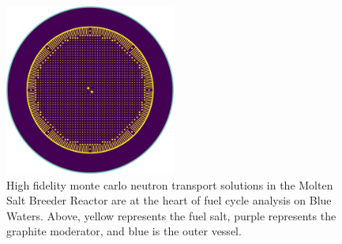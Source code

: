 \documentclass[letterpaper]{article}
\begin{document}
\begin{figure}[ht]
        \begin{center}
                \includegraphics[width=0.5\textwidth]{plan_view_ser.png}
        \end{center}
        \caption{High fidelity monte carlo neutron transport solutions in the
                Molten Salt Breeder Reactor are at the heart of fuel cycle
        analysis on Blue Waters. Above, yellow represents the fuel salt, purple 
represents the graphite moderator, and blue is the outer vessel.}
        \label{fig:plan_view}
\end{figure}
\end{document}
